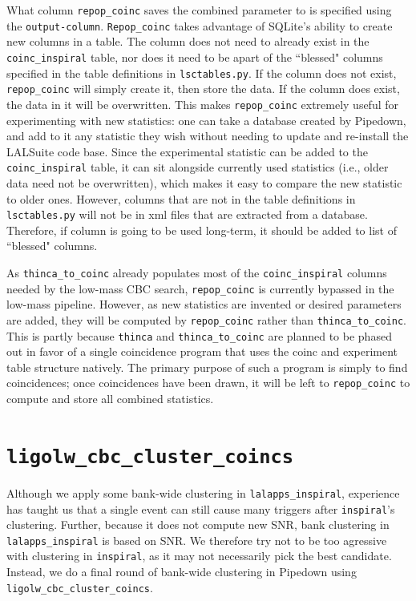 What column \verb|repop_coinc| saves the combined parameter to is specified using the \verb|output-column|. \verb|Repop_coinc| takes advantage of SQLite's ability to create new columns in a table. The column does not need to already exist in the \verb|coinc_inspiral| table, nor does it need to be apart of the ``blessed" columns specified in the table definitions in \verb|lsctables.py|. If the column does not exist, \verb|repop_coinc| will simply create it, then store the data. If the column does exist, the data in it will be overwritten. This makes \verb|repop_coinc| extremely useful for experimenting with new statistics: one can take a database created by Pipedown, and add to it any statistic they wish without needing to update and re-install the LALSuite code base. Since the experimental statistic can be added to the \verb|coinc_inspiral| table, it can sit alongside currently used statistics (i.e., older data need not be overwritten), which makes it easy to compare the new statistic to older ones. However, columns that are not in the table definitions in \verb|lsctables.py| will not be in xml files that are extracted from a database. Therefore, if column is going to be used long-term, it should be added to list of ``blessed" columns.

As \verb|thinca_to_coinc| already populates most of the \verb|coinc_inspiral| columns needed by the low-mass \ac{CBC} search, \verb|repop_coinc| is currently bypassed in the low-mass pipeline. However, as new statistics are invented or desired parameters are added, they will be computed by \verb|repop_coinc| rather than \verb|thinca_to_coinc|. This is partly because \verb|thinca| and \verb|thinca_to_coinc| are planned to be phased out in favor of a single coincidence program that uses the coinc and experiment table structure natively. The primary purpose of such a program is simply to find coincidences; once coincidences have been drawn, it will be left to \verb|repop_coinc| to compute and store all combined statistics.

\section{\texttt{ligolw\_cbc\_cluster\_coincs}}

Although we apply some bank-wide clustering in \verb|lalapps_inspiral|, experience has taught us that a single event can still cause many triggers after \verb|inspiral|'s clustering. Further, because it does not compute new \ac{SNR}, bank clustering in \verb|lalapps_inspiral| is based on \ac{SNR}. We therefore try not to be too agressive with clustering in \verb|inspiral|, as it may not necessarily pick the best candidate. Instead, we do a final round of bank-wide clustering in Pipedown using \verb|ligolw_cbc_cluster_coincs|.

